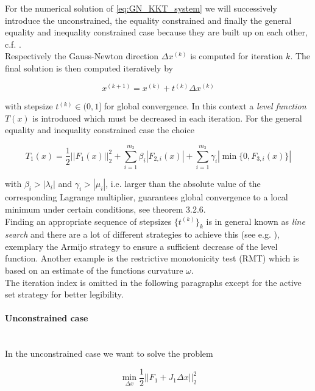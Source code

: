 \documentclass{scrartcl}[12pt, halfparskip]
\numberwithin{equation}{section}
\numberwithin{figure}{section}
\numberwithin{table}{section}
\begin{document}
For the numerical solution of \cref{eq:GN_KKT_system} we will successively introduce the unconstrained, the equality constrained and finally the general equality and inequality constrained case because they are built up on each other, c.f. \cite{numerical_methods_lsq_Bjorck}. \\
Respectively the Gauss-Newton direction $\Delta x^{(k)}$ is computed for iteration $k$. The final solution is then computed iteratively by

\begin{equation}
	x^{(k+1)} = x^{(k)} + t^{(k)} \Delta x^{(k)}
\end{equation}

with stepsize $t^{(k)} \in (0,1]$ for global convergence. In this context a \textit{level function} $T(x)$ is introduced which must be decreased in each iteration. For the general equality and inequality constrained case the choice

\begin{equation}
	T_1(x) = \frac{1}{2} || F_1(x) ||_2^2 + \sum_{i=1}^{m_2} \beta_i | F_{2,i}(x) | + \sum_{i=1}^{m_3} \gamma_i | \min\{0,F_{3,i}(x)\} |
\end{equation}

with $\beta_i > |\lambda_i|$ and $\gamma_i > |\mu_i|$, i.e. larger than the absolute value of the corresponding Lagrange multiplier, guarantees global convergence to a local minimum under certain conditions, see \cite{diss_bock} theorem 3.2.6. \\
Finding an appropriate sequence of stepsizes $\{ t^{(k)} \}_k$ is in general known as \textit{line search} and there are a lot of different strategies to achieve this (see e.g. \cite{nonlinear_optimiziation_wright}), exemplary the Armijo strategy to ensure a sufficient decrease of the level function. Another example is the restrictive monotonicity test (RMT) \cite{bock2000_RMT} which is based on an estimate of the functions curvature $\omega$. \\

The iteration index is omitted in the following paragraphs except for the active set strategy for better legibility.

\paragraph{Unconstrained case}\mbox{}\\
In the unconstrained case we want to solve the problem

\begin{equation}
\min_{\Delta x} \frac{1}{2} || F_1 + J_1 \Delta x ||_2^2
\label{eq:numerical_solution_LSQ}
\end{equation}
\end{document}
